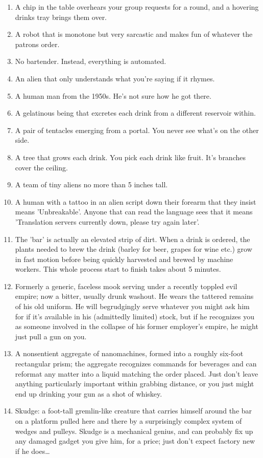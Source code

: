 \documentclass{article}
\begin{document}
\begin{enumerate}
	\item A chip in the table overhears your group requests for a round, and a hovering drinks tray brings them over.
	\item A robot that is monotone but very sarcastic and makes fun of whatever the patrons order.
	\item No bartender. Instead, everything is automated.
	\item An alien that only understands what you're saying if it rhymes.
	\item A human man from the 1950s. He's not sure how he got there.
	\item A gelatinous being that excretes each drink from a different reservoir within.
	\item A pair of tentacles emerging from a portal. You never see what's on the other side.
	\item A tree that grows each drink. You pick each drink like fruit. It's branches cover the ceiling.
	\item A team of tiny aliens no more than 5 inches tall.
	\item A human with a tattoo in an alien script down their forearm that they insist means 'Unbreakable'. Anyone that can read the language sees that it means 'Translation servers currently down, please try again later'.
	\item The 'bar' is actually an elevated strip of dirt. When a drink is ordered, the plants needed to brew the drink (barley for beer, grapes for wine etc.) grow in fast motion before being quickly harvested and brewed by machine workers. This whole process start to finish takes about 5 minutes.
	\item Formerly a generic, faceless mook serving under a recently toppled evil empire; now a bitter, usually drunk washout. He wears the tattered remains of his old uniform. He will begrudgingly serve whatever you might ask him for if it's available in his (admittedly limited) stock, but if he recognizes you as someone involved in the collapse of his former employer's empire, he might just pull a gun on you.
	\item A nonsentient aggregate of nanomachines, formed into a roughly six-foot rectangular prism; the aggregate recognizes commands for beverages and can reformat any matter into a liquid matching the order placed. Just don't leave anything particularly important within grabbing distance, or you just might end up drinking your gun as a shot of whiskey.
	\item Skudge: a foot-tall gremlin-like creature that carries himself around the bar on a platform pulled here and there by a surprisingly complex system of wedges and pulleys. Skudge is a mechanical genius, and can probably fix up any damaged gadget you give him, for a price; just don't expect factory new if he does…

\end{enumerate}
\end{document}
